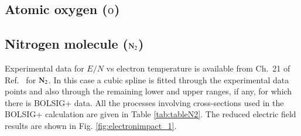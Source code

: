 \subsection{Atomic oxygen ($\rm O$)}

\subsection{Nitrogen molecule ($\rm N_2$)}

Experimental data for $E/N$ vs electron temperature is available from Ch.\ 21 of Ref.\  for $\rm N_2$. In this case a cubic spline is fitted through the experimental data points and also through the remaining lower and upper ranges, if any, for which there is BOLSIG+ data. All the processes involving cross-sections used in the BOLSIG+ calculation are given in Table \ref{tab:tableN2}. The reduced electric field results are shown in Fig. \ref{fig:electronimpact_1}.

